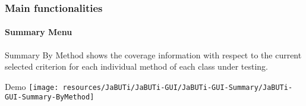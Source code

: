 \begin{frame}
\frametitle{Main functionalities}
\framesubtitle{Summary Menu}
\label{concept:by-method}

\begin{block}{Summary By Method}
 shows the coverage information with respect
to the current selected criterion for each individual method of each class
under testing.
\end{block}

\begin{block}{Demo}
\texttt{[image: resources/JaBUTi/JaBUTi-GUI/JaBUTi-GUI-Summary/JaBUTi-GUI-Summary-ByMethod]}
\end{block}
\end{frame}